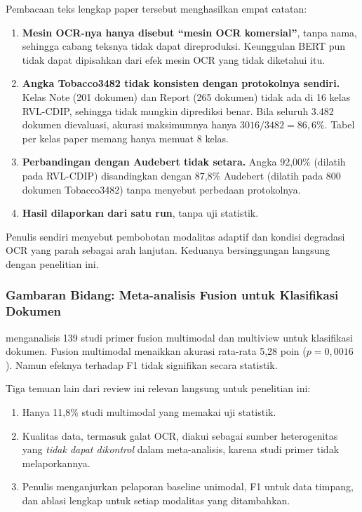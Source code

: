 Pembacaan teks lengkap paper tersebut menghasilkan empat catatan:
\begin{enumerate}
  \item \textbf{Mesin OCR-nya hanya disebut \enquote{mesin OCR komersial}}, tanpa nama,
  sehingga cabang teksnya tidak dapat direproduksi. Keunggulan BERT pun tidak dapat
  dipisahkan dari efek mesin OCR yang tidak diketahui itu.
  \item \textbf{Angka Tobacco3482 tidak konsisten dengan protokolnya sendiri.} Kelas Note
  (201 dokumen) dan Report (265 dokumen) tidak ada di 16 kelas RVL-CDIP, sehingga tidak
  mungkin diprediksi benar. Bila seluruh 3.482 dokumen dievaluasi, akurasi maksimumnya
  hanya $3016/3482 = 86{,}6\%$. Tabel per kelas paper memang hanya memuat 8 kelas.
  \item \textbf{Perbandingan dengan Audebert tidak setara.} Angka 92,00\% (dilatih pada
  RVL-CDIP) disandingkan dengan 87,8\% Audebert (dilatih pada 800 dokumen Tobacco3482)
  tanpa menyebut perbedaan protokolnya.
  \item \textbf{Hasil dilaporkan dari satu run}, tanpa uji statistik.
\end{enumerate}
Penulis sendiri menyebut pembobotan modalitas adaptif dan kondisi degradasi OCR yang
parah sebagai arah lanjutan. Keduanya bersinggungan langsung dengan penelitian ini.

\subsubsection{Gambaran Bidang: Meta-analisis Fusion untuk Klasifikasi Dokumen}

\textcite{mironczuk2026} menganalisis 139 studi primer fusion multimodal dan multiview
untuk klasifikasi dokumen. Fusion multimodal menaikkan akurasi rata-rata 5,28 poin
($p = 0{,}0016$). Namun efeknya terhadap F1 tidak signifikan secara statistik.

Tiga temuan lain dari review ini relevan langsung untuk penelitian ini:
\begin{enumerate}
  \item Hanya 11,8\% studi multimodal yang memakai uji statistik.
  \item Kualitas data, termasuk galat OCR, diakui sebagai sumber heterogenitas yang
  \emph{tidak dapat dikontrol} dalam meta-analisis, karena studi primer tidak
  melaporkannya.
  \item Penulis menganjurkan pelaporan baseline unimodal, F1 untuk data timpang, dan
  ablasi lengkap untuk setiap modalitas yang ditambahkan.
\end{enumerate}

